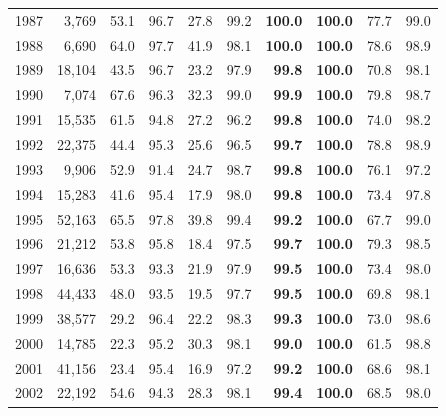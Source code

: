 {\begin{longtable}{rrrrrrrrrr}
1987 & 3,769 & 53.1 & 96.7 & 27.8 & 99.2 & \cellcolor{gray!15}\textbf{100.0} & \cellcolor{gray!15}\textbf{100.0} & 77.7 & 99.0 \\
1988 & 6,690 & 64.0 & 97.7 & 41.9 & 98.1 & \cellcolor{gray!15}\textbf{100.0} & \cellcolor{gray!15}\textbf{100.0} & 78.6 & 98.9 \\
1989 & 18,104 & 43.5 & 96.7 & 23.2 & 97.9 & \cellcolor{gray!15}\textbf{99.8} & \cellcolor{gray!15}\textbf{100.0} & 70.8 & 98.1 \\
1990 & 7,074 & 67.6 & 96.3 & 32.3 & 99.0 & \cellcolor{gray!15}\textbf{99.9} & \cellcolor{gray!15}\textbf{100.0} & 79.8 & 98.7 \\
1991 & 15,535 & 61.5 & 94.8 & 27.2 & 96.2 & \cellcolor{gray!15}\textbf{99.8} & \cellcolor{gray!15}\textbf{100.0} & 74.0 & 98.2 \\
1992 & 22,375 & 44.4 & 95.3 & 25.6 & 96.5 & \cellcolor{gray!15}\textbf{99.7} & \cellcolor{gray!15}\textbf{100.0} & 78.8 & 98.9 \\
1993 & 9,906 & 52.9 & 91.4 & 24.7 & 98.7 & \cellcolor{gray!15}\textbf{99.8} & \cellcolor{gray!15}\textbf{100.0} & 76.1 & 97.2 \\
1994 & 15,283 & 41.6 & 95.4 & 17.9 & 98.0 & \cellcolor{gray!15}\textbf{99.8} & \cellcolor{gray!15}\textbf{100.0} & 73.4 & 97.8 \\
1995 & 52,163 & 65.5 & 97.8 & 39.8 & 99.4 & \cellcolor{gray!15}\textbf{99.2} & \cellcolor{gray!15}\textbf{100.0} & 67.7 & 99.0 \\
1996 & 21,212 & 53.8 & 95.8 & 18.4 & 97.5 & \cellcolor{gray!15}\textbf{99.7} & \cellcolor{gray!15}\textbf{100.0} & 79.3 & 98.5 \\
1997 & 16,636 & 53.3 & 93.3 & 21.9 & 97.9 & \cellcolor{gray!15}\textbf{99.5} & \cellcolor{gray!15}\textbf{100.0} & 73.4 & 98.0 \\
1998 & 44,433 & 48.0 & 93.5 & 19.5 & 97.7 & \cellcolor{gray!15}\textbf{99.5} & \cellcolor{gray!15}\textbf{100.0} & 69.8 & 98.1 \\
1999 & 38,577 & 29.2 & 96.4 & 22.2 & 98.3 & \cellcolor{gray!15}\textbf{99.3} & \cellcolor{gray!15}\textbf{100.0} & 73.0 & 98.6 \\
2000 & 14,785 & 22.3 & 95.2 & 30.3 & 98.1 & \cellcolor{gray!15}\textbf{99.0} & \cellcolor{gray!15}\textbf{100.0} & 61.5 & 98.8 \\
2001 & 41,156 & 23.4 & 95.4 & 16.9 & 97.2 & \cellcolor{gray!15}\textbf{99.2} & \cellcolor{gray!15}\textbf{100.0} & 68.6 & 98.1 \\
2002 & 22,192 & 54.6 & 94.3 & 28.3 & 98.1 & \cellcolor{gray!15}\textbf{99.4} & \cellcolor{gray!15}\textbf{100.0} & 68.5 & 98.0 \\

\end{longtable}}
